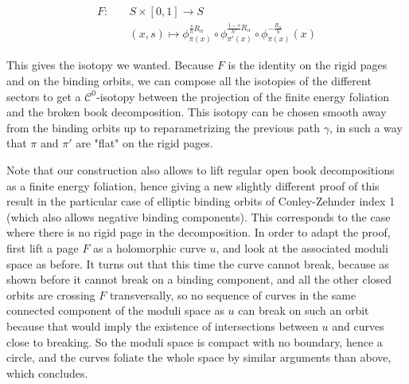 \documentclass[../main.tex]{subfiles}
\begin{document}
\begin{align*}
    F : \quad  &S\times [0,1]\longrightarrow S\\
    &(x,s) \longmapsto\phi_{\pi(x)}^{\frac{s}{h}R_\alpha  }\circ\phi^{\frac{1-s}{h'}R_\alpha}_{\pi'(x)}\circ\phi_{\pi(x)}^{-\frac{R_\alpha}{h}}(x)
\end{align*}

This gives the isotopy we wanted. Because $F$ is the identity on the rigid pages and on the binding orbits, we can compose all the isotopies of the different sectors to get a $\mathcal{C}^0$-isotopy between the projection of the finite energy foliation and the broken book decomposition. This isotopy can be chosen smooth away from the binding orbits up to reparametrizing the previous path $\gamma$, in such a way that $\pi$ and $\pi'$ are "flat" on the rigid pages. 


\begin{remark}
    Note that our construction also allows to lift regular open book decompositions as a finite energy foliation, hence giving a new slightly different proof of this result in the particular case of elliptic binding orbits of Conley-Zehnder index 1 (which also allows negative binding components). This corresponds to the case where there is no rigid page in the decomposition. In order to adapt the proof, first lift a page $F$ as a holomorphic curve $u$, and look at the associated moduli space as before. It turns out that this time the curve cannot break, because as shown before it cannot break on a binding component, and all the other closed orbits are crossing $F$ transversally, so no sequence of curves in the same connected component of the moduli space as $u$ can break on such an orbit because that would imply the existence of intersections between $u$ and curves close to breaking. So the moduli space is compact with no boundary, hence a circle, and the curves foliate the whole space by similar arguments than above, which concludes.
\end{remark}
\end{document}
